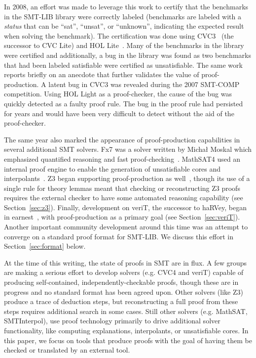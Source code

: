 \documentclass{llncs}
\begin{document}
In 2008, an effort was made to leverage this work to certify that the
benchmarks in the SMT-LIB library were correctly labeled (benchmarks are
labeled with a \emph{status} that can be ``sat'', ``unsat'', or ``unknown'',
indicating the expected result when solving the benchmark).  The certification
was done using CVC3~\cite{BT07} (the successor to CVC Lite) and
HOL Lite~\cite{GB08}.  Many of the benchmarks in the library were certified and
additionally, a bug in the library was found as two benchmarks that had been
labeled satisfiable were certified as unsatisfiable.
The same work reports briefly on an anecdote that further validates the value
of proof-production.  A latent bug in CVC3 was revealed during the 2007
SMT-COMP competition.  Using HOL Light as a proof-checker, the cause of the bug
was quickly detected as a faulty proof rule.  The bug in the proof rule had
persisted for years and would have been very difficult to detect without the
aid of the proof-checker.

The same year also marked the appearance of proof-production capabilities in
several additional SMT solvers.  Fx7 was a solver written by Micha{\l} Moskal
which emphasized quantified reasoning and fast proof-checking~\cite{M08}.
MathSAT4 used an internal proof engine to enable the generation of
unsatisfiable cores and interpolants~\cite{BCF+08}.  Z3 began supporting
proof-production as well~\cite{dMB08}, though its use of a single rule for
theory lemmas meant that checking or reconstructing Z3 proofs requires the
external checker to have some automated reasoning capability (see
Section~\ref{sec:z3}).  Finally, development on veriT, the successor to haRVey,
began in earnest~\cite{BdOD+09}, with proof-production as a primary goal (see Section~\ref{sec:veriT}).
Another important community development around this time was an attempt to
converge on a standard proof format for SMT-LIB.  We discuss this effort in
Section~\ref{sec:format} below.

At the time of this writing, the state of proofs in SMT are in flux.  A few
groups are making a serious effort to develop solvers (e.g. CVC4 and veriT)
capable of producing self-contained, independently-checkable proofs, though
these are in progress and no standard format has been agreed upon.  Other
solvers (like Z3) produce a trace of deduction steps, but reconstructing a full
proof from these steps requires additional search in some cases.  Still other
solvers (e.g. MathSAT, SMTInterpol), use proof technology primarily to drive
additional solver functionality, like computing explanations, interpolants, or
unsatisfiable cores.  In this paper, we focus on tools that produce proofs with
the goal of having them be checked or translated by an external tool.
\end{document}
